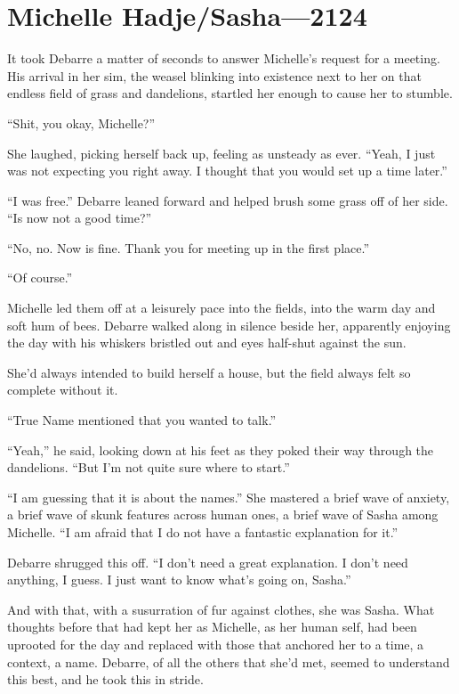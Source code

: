 \hypertarget{michelle-hadjesasha-2124}{%
\chapter{Michelle Hadje/Sasha---2124}\label{michelle-hadjesasha-2124}}

It took Debarre a matter of seconds to answer Michelle's request for a meeting. His arrival in her sim, the weasel blinking into existence next to her on that endless field of grass and dandelions, startled her enough to cause her to stumble.

``Shit, you okay, Michelle?''

She laughed, picking herself back up, feeling as unsteady as ever. ``Yeah, I just was not expecting you right away. I thought that you would set up a time later.''

``I was free.'' Debarre leaned forward and helped brush some grass off of her side. ``Is now not a good time?''

``No, no. Now is fine. Thank you for meeting up in the first place.''

``Of course.''

Michelle led them off at a leisurely pace into the fields, into the warm day and soft hum of bees. Debarre walked along in silence beside her, apparently enjoying the day with his whiskers bristled out and eyes half-shut against the sun.

She'd always intended to build herself a house, but the field always felt so complete without it.

``True Name mentioned that you wanted to talk.''

``Yeah,'' he said, looking down at his feet as they poked their way through the dandelions. ``But I'm not quite sure where to start.''

``I am guessing that it is about the names.'' She mastered a brief wave of anxiety, a brief wave of skunk features across human ones, a brief wave of Sasha among Michelle. ``I am afraid that I do not have a fantastic explanation for it.''

Debarre shrugged this off. ``I don't need a great explanation. I don't need anything, I guess. I just want to know what's going on, Sasha.''

And with that, with a susurration of fur against clothes, she was Sasha. What thoughts before that had kept her as Michelle, as her human self, had been uprooted for the day and replaced with those that anchored her to a time, a context, a name. Debarre, of all the others that she'd met, seemed to understand this best, and he took this in stride.

